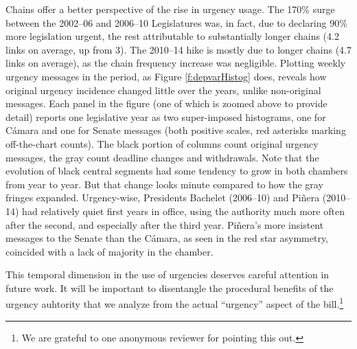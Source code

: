 \documentclass[letter,12pt]{article}
\begin{document}

Chains offer a better perspective of the rise in urgency usage. The 170\% surge between the 2002--06 and 2006--10 Legislatures was, in fact, due to declaring 90\%  more legislation urgent, the rest attributable to substantially longer chains (4.2 links on average, up from 3). The 2010--14 hike is mostly due to longer chains (4.7 links on average), as the chain frequency increase was negligible. Plotting weekly urgency messages in the period, as Figure \ref{f:depvarHistog} does, reveals how original urgency incidence changed little over the years, unlike non-original messages. Each panel in the figure (one of which is zoomed above to provide detail) reports one legislative year as two super-imposed histograms, one for C\'amara and one for Senate messages (both positive scales, red asterisks marking off-the-chart counts). The black portion of columns count original urgency messages, the gray count deadline changes and withdrawals. Note that the evolution of black central segments had some tendency to grow in both chambers from year to year. But that change looks minute compared to how the gray fringes expanded. Urgency-wise, Presidents Bachelet (2006--10) and Pi\~nera (2010--14) had relatively quiet first years in office, using the authority much more often after the second, and especially after the third year. Pi\~nera's more insistent messages to the Senate than the C\'amara, as seen in the red star asymmetry, coincided with a lack of majority in the chamber. 

This temporal dimension in the use of urgencies deserves careful attention in future work. It will be important to disentangle the procedural benefits of the urgency auhtority that we analyze from the actual ``urgency'' aspect of the bill.\footnote{We are grateful to one anonymous reviewer for pointing this out.}
\end{document}
